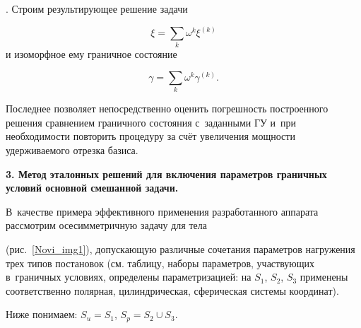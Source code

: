 \begin{enumerate}
. Строим результирующее решение задачи 

$$\xi =\sum\limits_{k}{{{\omega }^{k}}}{{\xi }^{(k)}}$$ и изоморфное ему  граничное состояние 

$$\gamma =\sum\limits_{k}{{{\omega }^{k}}}{{\gamma }^{(k)}}.$$ 

Последнее позволяет непосредственно оценить погрешность построенного решения сравнением граничного состояния с~заданными ГУ и~при необходимости повторить процедуру за счёт увеличения мощности удерживаемого отрезка базиса.





\end{enumerate}



{\bf 3. Метод эталонных решений для включения параметров граничных условий основной смешанной задачи.}

В~качестве примера эффективного применения разработанного аппарата рассмотрим осесимметричную задачу для тела 

(рис.~\ref{Novi_img1}), допускающую различные сочетания параметров нагружения трех типов постановок (см. таблицу, наборы параметров, участвующих в~граничных условиях, определены параметризацией: на $S_{1}$, $S_{2}$, $S_{3} $ применены соответственно полярная, цилиндрическая, сферическая системы координат). 

Ниже понимаем:  $S_{u} =S_{1}$, $S_{p} =S_{2} \cup S_{3} $.



